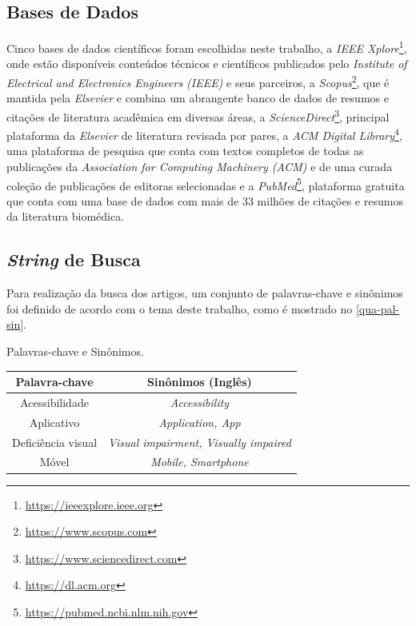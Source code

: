 \subsection{Bases de Dados}
Cinco bases de dados científicos foram escolhidas neste trabalho, a \emph{IEEE Xplore}\footnote{\url{https://ieeexplore.ieee.org}}, onde estão disponíveis conteúdos técnicos e científicos publicados pelo \emph{Institute of Electrical and Electronics Engineers (IEEE)} e seus parceiros,
a \emph{Scopus}\footnote{\url{https://www.scopus.com}}, que é mantida pela \emph{Elsevier} e combina um abrangente banco de dados de resumos e citações de literatura acadêmica em diversas áreas, a \emph{ScienceDirect}\footnote{\url{https://www.sciencedirect.com}}, principal plataforma da \emph{Elsevier} de literatura revisada por pares,
a \emph{ACM Digital Library}\footnote{\url{https://dl.acm.org}}, uma plataforma de pesquisa que conta com textos completos de todas as publicações da \emph{Association for Computing Machinery (ACM)} e de uma curada coleção de publicações de editoras selecionadas e a \emph{PubMed}\footnote{\url{https://pubmed.ncbi.nlm.nih.gov}},
plataforma gratuita que conta com uma base de dados com mais de 33 milhões de citações e resumos da literatura biomédica.

\subsection{\emph{String} de Busca}
Para realização da busca dos artigos, um conjunto de palavras-chave e sinônimos foi definido de acordo com o tema deste trabalho, como é mostrado no \autoref{qua-pal-sin}.

\begin{quadro}[htb]
  \caption{\label{qua-pal-sin}Palavras-chave e Sinônimos.}
  \begin{tabular}{|c|c|}
    \hline
    \textbf{Palavra-chave} & \textbf{Sinônimos (Inglês)}                 \\ \hline
    Acessibilidade         & \emph{Accessibility}                        \\ \hline
    Aplicativo             & \emph{Application, App}                     \\ \hline
    Deficiência visual     & \emph{Visual impairment, Visually impaired} \\ \hline
    Móvel                  & \emph{Mobile, Smartphone}                   \\ \hline
  \end{tabular}
\end{quadro}

